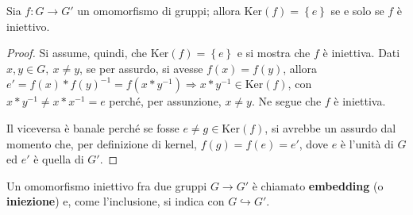 \documentclass[11pt, a4paper]{scrartcl}
\theoremstyle{definition}
\numberwithin{esempio}{section}
\theoremstyle{definition}
\numberwithin{obs}{section}
\numberwithin{nota}{section}
\numberwithin{equation}{subsection}
\begin{document}
\begin{prop}
	{}{}
	Sia $f : G\to G'$ un omomorfismo di gruppi; allora $\mathrm{Ker} (f) = \left\{ e \right\} $ se e solo se $f$ \`e iniettivo.
	\begin{proof}
		Si assume, quindi, che $\mathrm{Ker} (f) = \left\{ e \right\} $ e si mostra che $f$ \`e iniettiva. Dati $x,y \in G, \ x\neq y$, se per assurdo, si avesse $f(x) = f(y)$, allora $ e'=  f(x) * f(y)^{-1} = f(x * y^{-1} )\Rightarrow x*y^{-1}  \in \mathrm{Ker} (f)$, con $x*y^{-1}  \neq x * x^{-1} = e$ perch\'e, per assunzione, $x \neq y$.
		Ne segue che $f$ \`e iniettiva.

		Il viceversa \`e banale perch\'e se fosse $e\neq g \in \mathrm{Ker} (f)$, si avrebbe un assurdo dal momento che, per definizione di kernel, $f(g) = f(e) = e'$, dove $e$ \`e l'unit\`a di $G$ ed $e'$ \`e quella di $G'$.
	\end{proof}
\end{prop}
\noindent Un omomorfismo iniettivo fra due gruppi $G\to G'$ \`e chiamato \textbf{embedding} (o \textbf{iniezione}) e, come l'inclusione, si indica con $G \hookrightarrow G'$.
\end{document}
